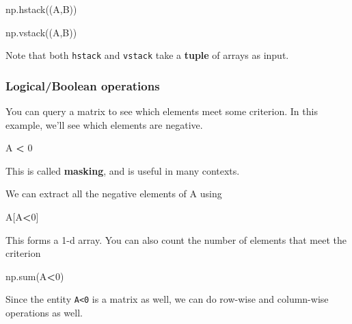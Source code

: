 \documentclass[
  letterpaper,
]{scrbook}
\newenvironment{Shaded}{\begin{snugshade}}{\end{snugshade}}
\newcommand{\BuiltInTok}[1]{#1}
\newcommand{\DecValTok}[1]{\textcolor[rgb]{0.00,0.00,0.81}{#1}}
\newcommand{\NormalTok}[1]{#1}
\newcommand{\OperatorTok}[1]{\textcolor[rgb]{0.81,0.36,0.00}{\textbf{#1}}}
\begin{document}
\begin{Shaded}
\begin{Highlighting}[]
\NormalTok{np.hstack((A,B))}
\end{Highlighting}
\end{Shaded}

\begin{Shaded}
\begin{Highlighting}[]
\NormalTok{np.vstack((A,B))}
\end{Highlighting}
\end{Shaded}

Note that both \texttt{hstack} and \texttt{vstack} take a \textbf{tuple} of arrays as input.

\hypertarget{logicalboolean-operations}{%
\subsubsection{Logical/Boolean operations}\label{logicalboolean-operations}}

You can query a matrix to see which elements meet some criterion. In this example, we'll see which elements are negative.

\begin{Shaded}
\begin{Highlighting}[]
\NormalTok{A }\OperatorTok{\textless{}} \DecValTok{0}
\end{Highlighting}
\end{Shaded}

This is called \textbf{masking}, and is useful in many contexts.

We can extract all the negative elements of A using

\begin{Shaded}
\begin{Highlighting}[]
\NormalTok{A[A}\OperatorTok{\textless{}}\DecValTok{0}\NormalTok{]}
\end{Highlighting}
\end{Shaded}

This forms a 1-d array. You can also count the number of elements that meet the criterion

\begin{Shaded}
\begin{Highlighting}[]
\NormalTok{np.}\BuiltInTok{sum}\NormalTok{(A}\OperatorTok{\textless{}}\DecValTok{0}\NormalTok{)}
\end{Highlighting}
\end{Shaded}

Since the entity \texttt{A\textless{}0} is a matrix as well, we can do row-wise and column-wise operations as well.
\end{document}
